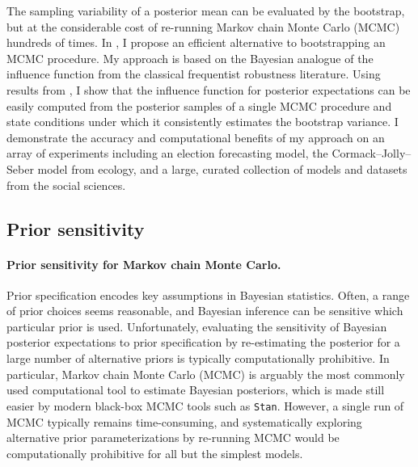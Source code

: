 The sampling variability of a posterior mean can be evaluated by the bootstrap,
but at the considerable cost of re-running Markov chain Monte Carlo (MCMC)
hundreds of times. In \citet{giordano:2020:stanconbayesij,
giordano:2021:bayesij}, I propose an efficient alternative to bootstrapping an
MCMC procedure.  My approach is based on the Bayesian analogue of the influence
function from the classical frequentist robustness literature.  Using results
from \citet{giordano:2018:covariances, giordano:2019:ij}, I show that the
influence function for posterior expectations can be easily computed from the
posterior samples of a single MCMC procedure and state conditions under which it
consistently estimates the bootstrap variance. I demonstrate the accuracy and
computational benefits of my approach on an array of experiments including an
election forecasting model, the Cormack--Jolly--Seber model from ecology, and a
large, curated collection of models and datasets from the social sciences.



\subsection{Prior sensitivity}

\paragraph{Prior sensitivity for Markov chain Monte Carlo.}
%
Prior specification encodes key assumptions in Bayesian statistics.  Often, a
range of prior choices seems reasonable, and Bayesian inference can be sensitive
which particular prior is used.  Unfortunately, evaluating the sensitivity of
Bayesian posterior expectations to prior specification by re-estimating the
posterior for a large number of alternative priors is typically computationally
prohibitive. In particular, Markov chain Monte Carlo (MCMC) is arguably the most
commonly used computational tool to estimate Bayesian posteriors, which is made
still easier by modern black-box MCMC tools such as \texttt{Stan}. However, a
single run of MCMC typically remains time-consuming, and systematically
exploring alternative prior parameterizations by re-running MCMC would be
computationally prohibitive for all but the simplest models.

